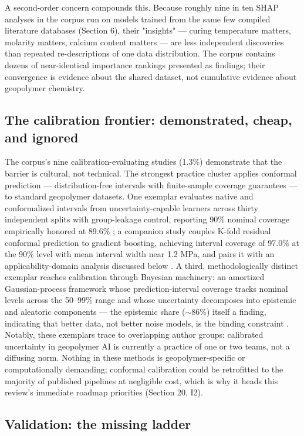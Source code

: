 \documentclass[pdflatex,sn-basic]{sn-jnl}
\begin{document}
A second-order concern compounds this. Because roughly nine in ten SHAP analyses in the corpus run on models trained from the same few compiled literature databases (Section 6), their "insights" --- curing temperature matters, molarity matters, calcium content matters --- are less independent discoveries than repeated re-descriptions of one data distribution. The corpus contains dozens of near-identical importance rankings presented as findings; their convergence is evidence about the shared dataset, not cumulative evidence about geopolymer chemistry.

\subsection{The calibration frontier: demonstrated, cheap, and ignored}

The corpus's nine calibration-evaluating studies (1.3\%) demonstrate that the barrier is cultural, not technical. The strongest practice cluster applies conformal prediction --- distribution-free intervals with finite-sample coverage guarantees --- to standard geopolymer datasets. One exemplar evaluates native and conformalized intervals from uncertainty-capable learners across thirty independent splits with group-leakage control, reporting 90\% nominal coverage empirically honored at 89.6\% \citep{parakhiya2026}; a companion study couples K-fold residual conformal prediction to gradient boosting, achieving interval coverage of 97.0\% at the 90\% level with mean interval width near 1.2 MPa, and pairs it with an applicability-domain analysis discussed below \citep{jagad2026}. A third, methodologically distinct exemplar reaches calibration through Bayesian machinery: an amortized Gaussian-process framework whose prediction-interval coverage tracks nominal levels across the 50--99\% range and whose uncertainty decomposes into epistemic and aleatoric components --- the epistemic share ($\sim$86\%) itself a finding, indicating that better data, not better noise models, is the binding constraint \citep{chan2026}. Notably, these exemplars trace to overlapping author groups: calibrated uncertainty in geopolymer AI is currently a practice of one or two teams, not a diffusing norm. Nothing in these methods is geopolymer-specific or computationally demanding; conformal calibration could be retrofitted to the majority of published pipelines at negligible cost, which is why it heads this review's immediate roadmap priorities (Section 20, I2).

\subsection{Validation: the missing ladder}
\end{document}
